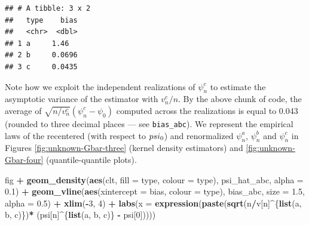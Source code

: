 \documentclass[]{article}
\newenvironment{Shaded}{\begin{snugshade}}{\end{snugshade}}
\newcommand{\DataTypeTok}[1]{\textcolor[rgb]{0.13,0.29,0.53}{#1}}
\newcommand{\DecValTok}[1]{\textcolor[rgb]{0.00,0.00,0.81}{#1}}
\newcommand{\FloatTok}[1]{\textcolor[rgb]{0.00,0.00,0.81}{#1}}
\newcommand{\KeywordTok}[1]{\textcolor[rgb]{0.13,0.29,0.53}{\textbf{#1}}}
\newcommand{\NormalTok}[1]{#1}
\newcommand{\OperatorTok}[1]{\textcolor[rgb]{0.81,0.36,0.00}{\textbf{#1}}}
\newcommand{\StringTok}[1]{\textcolor[rgb]{0.31,0.60,0.02}{#1}}
\theoremstyle{definition}
\theoremstyle{definition}
\theoremstyle{definition}
\theoremstyle{remark}
\begin{document}
\begin{verbatim}
## # A tibble: 3 x 2
##   type    bias
##   <chr>  <dbl>
## 1 a     1.46  
## 2 b     0.0696
## 3 c     0.0435
\end{verbatim}

Note how we exploit the independent realizations of \(\psi_{n}^{c}\) to
estimate the asymptotic variance of the estimator with \(v_{n}^{c}/n\).
By the above chunk of code, the average of
\(\sqrt{n/v_{n}^{c}} (\psi_{n}^{c} - \psi_{0})\) computed across the
realizations is equal to 0.043 (rounded to three decimal places --- see
\texttt{bias\_abc}). We represent the empirical laws of the recentered
(with respect to \(\\psi_{0}\)) and renormalized \(\psi_{n}^{a}\),
\(\psi_{n}^{b}\) and \(\psi_{n}^{c}\) in Figures
\ref{fig:unknown-Gbar-three} (kernel density estimators) and
\ref{fig:unknown-Gbar-four} (quantile-quantile plots).

\begin{Shaded}
\begin{Highlighting}[]
\NormalTok{fig }\OperatorTok{+}
\StringTok{  }\KeywordTok{geom_density}\NormalTok{(}\KeywordTok{aes}\NormalTok{(clt, }\DataTypeTok{fill =}\NormalTok{ type, }\DataTypeTok{colour =}\NormalTok{ type), psi_hat_abc, }\DataTypeTok{alpha =} \FloatTok{0.1}\NormalTok{) }\OperatorTok{+}
\StringTok{  }\KeywordTok{geom_vline}\NormalTok{(}\KeywordTok{aes}\NormalTok{(}\DataTypeTok{xintercept =}\NormalTok{ bias, }\DataTypeTok{colour =}\NormalTok{ type),}
\NormalTok{             bias_abc, }\DataTypeTok{size =} \FloatTok{1.5}\NormalTok{, }\DataTypeTok{alpha =} \FloatTok{0.5}\NormalTok{) }\OperatorTok{+}
\StringTok{  }\KeywordTok{xlim}\NormalTok{(}\OperatorTok{-}\DecValTok{3}\NormalTok{, }\DecValTok{4}\NormalTok{) }\OperatorTok{+}\StringTok{ }
\StringTok{  }\KeywordTok{labs}\NormalTok{(}\DataTypeTok{x =} \KeywordTok{expression}\NormalTok{(}\KeywordTok{paste}\NormalTok{(}\KeywordTok{sqrt}\NormalTok{(n}\OperatorTok{/}\NormalTok{v[n]}\OperatorTok{^}\NormalTok{\{}\KeywordTok{list}\NormalTok{(a, b, c)\})}\OperatorTok{*}
\StringTok{                            }\NormalTok{(psi[n]}\OperatorTok{^}\NormalTok{\{}\KeywordTok{list}\NormalTok{(a, b, c)\} }\OperatorTok{-}\StringTok{ }\NormalTok{psi[}\DecValTok{0}\NormalTok{]))))}
\end{Highlighting}
\end{Shaded}
\end{document}
